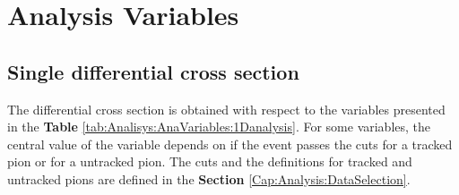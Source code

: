 \section{Analysis Variables}
\label{Cap:Analysis:Variables}

\subsection{Single differential cross section}
\label{Cap:Analysis:Variables:1DAnalysis}

The differential cross section is obtained with respect to the variables presented in the \textbf{Table} \ref{tab:Analisys:AnaVariables:1Danalysis}. For some variables, the central value of the variable depends on if the event passes the cuts for a tracked pion or for a untracked pion. The cuts and the definitions for tracked and untracked pions are defined in the \textbf{Section} \ref{Cap:Analysis:DataSelection}.

